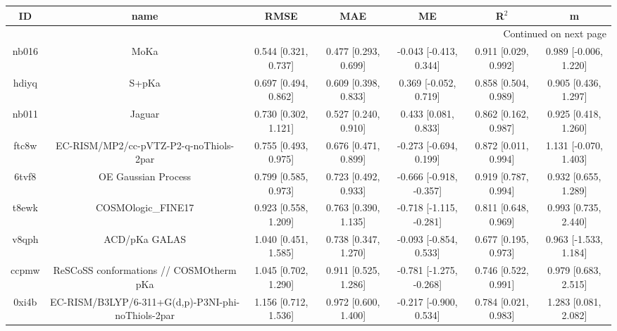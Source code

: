 \documentclass{article}
\begin{document}
\begin{center}
\begin{longtable}{|ccccccc|}
\toprule
    ID &                                               name &                     RMSE &                      MAE &                       ME &                 R$^2$ &                       m \\
\midrule
\endhead
\midrule
\multicolumn{7}{r}{{Continued on next page}} \\
\midrule
\endfoot

\bottomrule
\endlastfoot
 nb016 &                                               MoKa &     0.544 [0.321, 0.737] &     0.477 [0.293, 0.699] &   -0.043 [-0.413, 0.344] &  0.911 [0.029, 0.992] &   0.989 [-0.006, 1.220] \\
 hdiyq &                                              S+pKa &     0.697 [0.494, 0.862] &     0.609 [0.398, 0.833] &    0.369 [-0.052, 0.719] &  0.858 [0.504, 0.989] &    0.905 [0.436, 1.297] \\
 nb011 &                                             Jaguar &     0.730 [0.302, 1.121] &     0.527 [0.240, 0.910] &     0.433 [0.081, 0.833] &  0.862 [0.162, 0.987] &    0.925 [0.418, 1.260] \\
 ftc8w &             EC-RISM/MP2/cc-pVTZ-P2-q-noThiols-2par &     0.755 [0.493, 0.975] &     0.676 [0.471, 0.899] &   -0.273 [-0.694, 0.199] &  0.872 [0.011, 0.994] &   1.131 [-0.070, 1.403] \\
 6tvf8 &                                OE Gaussian Process &     0.799 [0.585, 0.973] &     0.723 [0.492, 0.933] &  -0.666 [-0.918, -0.357] &  0.919 [0.787, 0.994] &    0.932 [0.655, 1.289] \\
 t8ewk &                                 COSMOlogic\_FINE17 &     0.923 [0.558, 1.209] &     0.763 [0.390, 1.135] &  -0.718 [-1.115, -0.281] &  0.811 [0.648, 0.969] &    0.993 [0.735, 2.440] \\
 v8qph &                                      ACD/pKa GALAS &     1.040 [0.451, 1.585] &     0.738 [0.347, 1.270] &   -0.093 [-0.854, 0.533] &  0.677 [0.195, 0.973] &   0.963 [-1.533, 1.184] \\
 ccpmw &            ReSCoSS conformations // COSMOtherm pKa &     1.045 [0.702, 1.290] &     0.911 [0.525, 1.286] &  -0.781 [-1.275, -0.268] &  0.746 [0.522, 0.991] &    0.979 [0.683, 2.515] \\
 0xi4b &  EC-RISM/B3LYP/6-311+G(d,p)-P3NI-phi-noThiols-2par &     1.156 [0.712, 1.536] &     0.972 [0.600, 1.400] &   -0.217 [-0.900, 0.534] &  0.784 [0.021, 0.983] &    1.283 [0.081, 2.082] \\

\end{longtable}
\end{center}
\end{document}
